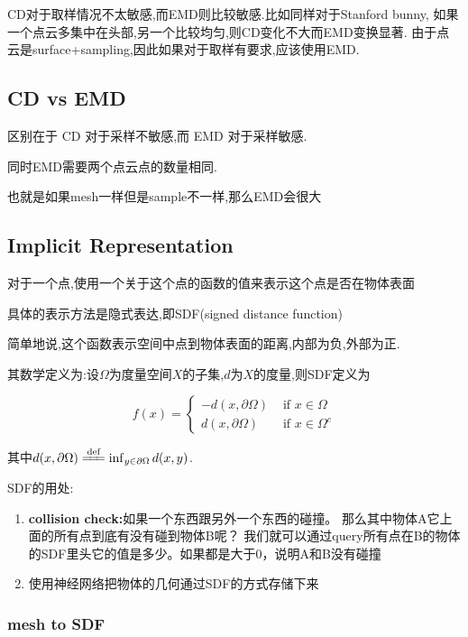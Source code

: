 CD对于取样情况不太敏感,而EMD则比较敏感.比如同样对于Stanford bunny,
如果一个点云多集中在头部,另一个比较均匀,则CD变化不大而EMD变换显著.
由于点云是surface+sampling,因此如果对于取样有要求,应该使用EMD.

\subsection{CD vs EMD}

区别在于 CD 对于采样不敏感,而 EMD 对于采样敏感.

同时EMD需要两个点云点的数量相同.

也就是如果mesh一样但是sample不一样,那么EMD会很大

\subsection{Implicit Representation}

对于一个点,使用一个关于这个点的函数的值来表示这个点是否在物体表面

具体的表示方法是隐式表达,即SDF(signed distance function)

简单地说,这个函数表示空间中点到物体表面的距离,内部为负,外部为正.

其数学定义为:设$\Omega$为度量空间$X$的子集,$d$为$X$的度量,则SDF定义为

\begin{equation}
    f(x)=\begin{cases}
        -d(x, \partial \Omega) & \text { if } x \in \Omega 
        \\
        d(x, \partial \Omega) & \text { if } x \in \Omega^{c}
    \end{cases}
\end{equation}

其中$d(x, \partial \Omega) \xlongequal{\text{def}} \inf_{y \in \partial \Omega} d(x, y)$.

SDF的用处:

\begin{enumerate}
    \item \textbf{collision check:}如果一个东西跟另外一个东西的碰撞。
    那么其中物体A它上面的所有点到底有没有碰到物体B呢？
    我们就可以通过query所有点在B的物体的SDF里头它的值是多少。如果都是大于0，说明A和B没有碰撞
    \item 使用神经网络把物体的几何通过SDF的方式存储下来
\end{enumerate}

\subsubsection{mesh to SDF}

